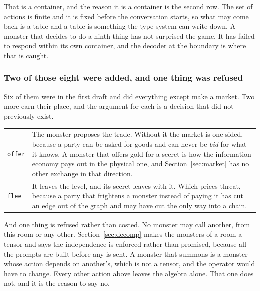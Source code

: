 \documentclass[11pt,a4paper]{article}
\begin{document}
That is a container, and the reason it is a container is the second row. The set of actions is
finite and it is fixed before the conversation starts, so what may come back is a table and a
table is something the type system can write down. A monster that decides to do a ninth thing has
not surprised the game. It has failed to respond within its own container, and the decoder at the
boundary is where that is caught.

\subsubsection*{Two of those eight were added, and one thing was refused}

Six of them were in the first draft and did everything except make a market. Two more earn their
place, and the argument for each is a decision that did not previously exist.

\begin{center}
\begin{tabular}{@{}l@{\hspace{5mm}}>{\raggedright\arraybackslash}p{}@{}}
\toprule
\texttt{offer} & The monster proposes the trade. Without it the market is one-sided, because a
party can be asked for goods and can never be \emph{bid} for what it knows. A monster that offers
gold for a secret is how the information economy pays out in the physical one, and
Section~\ref{sec:market} has no other exchange in that direction. \\[1mm]
\texttt{flee}  & It leaves the level, and its secret leaves with it. Which prices threat, because
a party that frightens a monster instead of paying it has cut an edge out of the graph and may
have cut the only way into a chain. \\
\bottomrule
\end{tabular}
\end{center}

\begin{alarmbox}
And one thing is refused rather than costed. No monster may call another, from this room or any
other. Section~\ref{sec:decomp} makes the monsters of a room a tensor and says the independence is
enforced rather than promised, because all the prompts are built before any is sent. A monster
that summons is a monster whose action depends on another's, which is not a tensor, and the
operator would have to change. Every other action above leaves the algebra alone. That one does
not, and it is the reason to say no.
\end{alarmbox}
\end{document}
